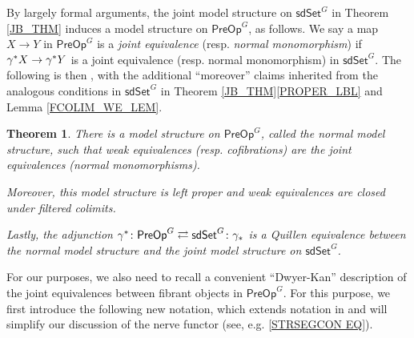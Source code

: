 \documentclass[a4paper,10pt]{article}%
\numberwithin{equation}{section}
\numberwithin{figure}{section}
\newtheorem{theorem}[equation]{Theorem}%
\theoremstyle{definition} %
\newcommand{\sdSet}{\mathsf{sdSet}}
\newcommand{\PreOp}{\mathsf{PreOp}}
\newcommand{\1}{\ensuremath{\mathbbm 1}}%
\begin{document}
By largely formal arguments, the joint model structure on 
$\mathsf{sdSet}^G$ in Theorem \ref{JB_THM}
induces a model structure on $\mathsf{PreOp}^G$,
as follows.
%
We say a map $X \to Y$ in $\PreOp^G$ is a 
\textit{joint equivalence} (resp. \textit{normal monomorphism}) if
$\gamma^{\**} X \to \gamma^{\**} Y$ is a joint equivalence 
(resp. normal monomorphism) in $\sdSet^G$.
%
The following is then \cite[Thms. 4.39 and 4.42]{BP_edss},
with the additional ``moreover'' claims 
inherited from the 
analogous conditions in $\mathsf{sdSet}^G$ in
Theorem \ref{JB_THM}\ref{PROPER_LBL}
and Lemma \ref{FCOLIM_WE_LEM}.


\begin{theorem}\label{PREOPMS THM}
	There is a model structure on $\PreOp^G$, called the 
	\emph{normal model structure}, 
	such that weak equivalences (resp. cofibrations) are the joint equivalences (normal monomorphisms).
	
	Moreover, this model structure is left proper
	and weak equivalences are closed under filtered colimits.
	
	Lastly, the adjunction $\gamma^{\**} \colon \PreOp^G \rightleftarrows \sdSet^G \colon \gamma_{\**}$ is a Quillen equivalence
	between the normal model structure and the joint model structure on $\sdSet^G$.
\end{theorem}


For our purposes, we also need to recall
a convenient ``Dwyer-Kan'' description of the joint equivalences
between fibrant objects in $\PreOp^G$.
For this purpose, we first introduce the following new notation,
which extends notation in \cite[Def. 5.7]{BP_edss}
and
will simplify our discussion of the nerve functor
(see, e.g. \eqref{STRSEGCON EQ}).
\end{document}
